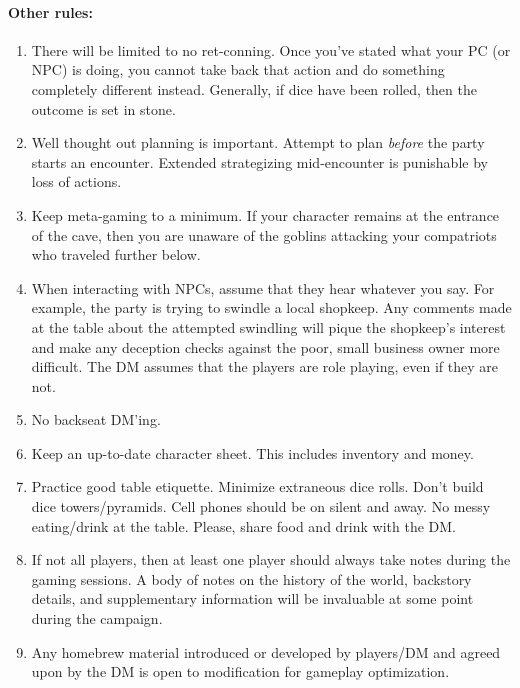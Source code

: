 \documentclass[12pt]{article}
\begin{document}
\paragraph{Other rules:} 
\begin{enumerate}
\item\textsf{There will be limited to no ret-conning. Once you've stated what your PC (or NPC) is doing, you cannot take back that action and do something completely different instead. Generally, if dice have been rolled, then the outcome is set in stone.}
\item\textsf{Well thought out planning is important. Attempt to plan \textit{before} the party starts an encounter. Extended strategizing mid-encounter is punishable by loss of actions.}
\item\textsf{Keep meta-gaming to a minimum. If your character remains at the entrance of the cave, then you are unaware of the goblins attacking your compatriots who traveled further below.}
\item\textsf{When interacting with NPCs, assume that they hear whatever you say. For example, the party is trying to swindle a local shopkeep. Any comments made at the table about the attempted swindling will pique the shopkeep's interest and make any deception checks against the poor, small business owner more difficult. The DM assumes that the players are role playing, even if they are not.}
\item\textsf{No backseat DM'ing.}
\item\textsf{Keep an up-to-date character sheet. This includes inventory and money.}
\item\textsf{Practice good table etiquette. Minimize extraneous dice rolls. Don't build dice towers/pyramids. Cell phones should be on silent and away. No messy eating/drink at the table. Please, share food and drink with the DM. }
\item\textsf{If not all players, then at least one player should always take notes during the gaming sessions. A body of notes on the history of the world, backstory details, and supplementary information will be invaluable at some point during the campaign.}
\item\textsf{Any homebrew material introduced or developed by players/DM and agreed upon by the DM is open to modification for gameplay optimization.}
\end{enumerate}
\end{document}
